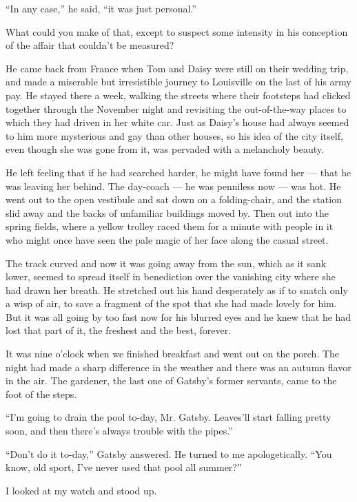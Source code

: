 \documentclass{znotebook}
\begin{document}
``In any case,'' he said, ``it was just personal.''

What could you make of that, except to suspect some intensity in his conception of the affair that couldn't be measured?

He came back from France when Tom and Daisy were still on their wedding trip, and made a miserable but irresistible journey to Louisville on the last of his army pay. He stayed there a week, walking the streets where their footsteps had clicked together through the November night and revisiting the out-of-the-way places to which they had driven in her white car. Just as Daisy's house had always seemed to him more mysterious and gay than other houses, so his idea of the city itself, even though she was gone from it, was pervaded with a melancholy beauty.

He left feeling that if he had searched harder, he might have found her ---{} that he was leaving her behind. The day-coach ---{} he was penniless now ---{} was hot. He went out to the open vestibule and sat down on a folding-chair, and the station slid away and the backs of unfamiliar buildings moved by. Then out into the spring fields, where a yellow trolley raced them for a minute with people in it who might once have seen the pale magic of her face along the casual street.

The track curved and now it was going away from the sun, which as it sank lower, seemed to spread itself in benediction over the vanishing city where she had drawn her breath. He stretched out his hand desperately as if to snatch only a wisp of air, to save a fragment of the spot that she had made lovely for him. But it was all going by too fast now for his blurred eyes and he knew that he had lost that part of it, the freshest and the best, forever.

It was nine o'clock when we finished breakfast and went out on the porch. The night had made a sharp difference in the weather and there was an autumn flavor in the air. The gardener, the last one of Gatsby's former servants, came to the foot of the steps.

``I'm going to drain the pool to-day, Mr. Gatsby. Leaves'll start falling pretty soon, and then there's always trouble with the pipes.''

``Don't do it to-day,'' Gatsby answered. He turned to me apologetically. ``You know, old sport, I've never used that pool all summer?''

I looked at my watch and stood up.
\end{document}
